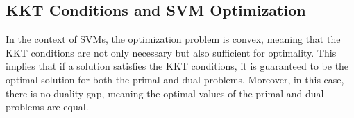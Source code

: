 \subsection{KKT Conditions and SVM Optimization}

In the context of SVMs, the optimization problem is convex, meaning that the KKT conditions are not only necessary but also sufficient for optimality. This implies that if a solution satisfies the KKT conditions, it is guaranteed to be the optimal solution for both the primal and dual problems. Moreover, in this case, there is no duality gap, meaning the optimal values of the primal and dual problems are equal.


